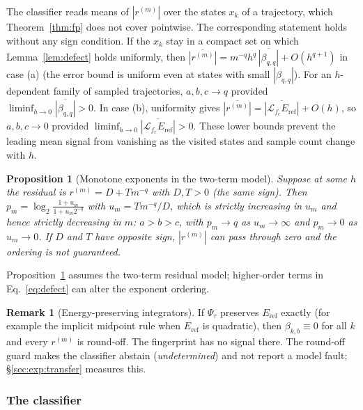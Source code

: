 \documentclass[10pt]{article}
\newtheorem{proposition}{Proposition}
\theoremstyle{definition}
\newtheorem{remark}{Remark}
\newcommand{\Lie}{\mathcal{L}}
\newcommand{\Eref}{E_{\mathrm{ref}}}
\begin{document}
The classifier reads means of $|r^{(m)}|$ over the states $x_k$ of a
trajectory, which Theorem~\ref{thm:fp} does not cover pointwise. The
corresponding statement holds without any sign condition. If the $x_k$ stay in
a compact set on which Lemma~\ref{lem:defect} holds uniformly, then
$\overline{|r^{(m)}|}=m^{-q}h^q\,\overline{|\beta_{q,q}|}+O(h^{q+1})$ in case
(a) (the error bound is uniform even at states with small $|\beta_{q,q}|$).
For an $h$-dependent family of sampled trajectories, $a,b,c\to q$
provided $\liminf_{h\to0}\overline{|\beta_{q,q}|}>0$. In case (b),
uniformity gives $\overline{|r^{(m)}|}=\overline{|\Lie_{f_c}\Eref|}+O(h)$,
so $a,b,c\to0$ provided $\liminf_{h\to0}\overline{|\Lie_{f_c}\Eref|}>0$.
These lower bounds prevent the leading mean signal from vanishing as the
visited states and sample count change with $h$.

\begin{proposition}[Monotone exponents in the two-term model]\label{prop:mono}
Suppose at some $h$ the residual is $r^{(m)}=D+Tm^{-q}$ with $D,T>0$ (the same
sign). Then $p_m=\log_2\frac{1+u_m}{1+u_m2^{-q}}$ with $u_m=T m^{-q}/D$,
which is strictly increasing in $u_m$ and hence strictly decreasing in $m$:
$a>b>c$, with $p_m\to q$ as $u_m\to\infty$ and $p_m\to0$ as $u_m\to0$. If $D$
and $T$ have opposite sign, $|r^{(m)}|$ can pass through zero and the
ordering is not guaranteed.
\end{proposition}

Proposition~\ref{prop:mono} assumes the two-term residual model; higher-order
terms in Eq.~\eqref{eq:defect} can alter the exponent ordering.

\begin{remark}[Energy-preserving integrators]\label{rem:conserving}
If $\Psi_\tau$ preserves $\Eref$ exactly (for example the implicit midpoint
rule when $\Eref$ is quadratic), then $\beta_{k,b}\equiv0$ for all $k$ and
every $r^{(m)}$ is round-off. The fingerprint has no signal there. The
round-off guard makes the classifier abstain (\emph{undetermined}) and not
report a model fault; \S\ref{sec:exp:transfer} measures this.
\end{remark}

\subsubsection{The classifier}\label{sec:classifier}
\end{document}
